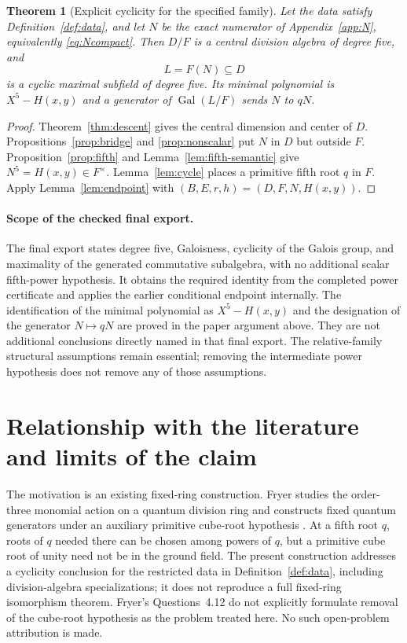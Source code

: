 \documentclass[11pt,letterpaper]{article}
\newtheorem{theorem}{Theorem}[section]
\theoremstyle{definition}
\theoremstyle{remark}
\newcommand{\Gal}{\operatorname{Gal}}
\begin{document}
\begin{theorem}[Explicit cyclicity for the specified family]
\label{thm:main}
Let the data satisfy Definition~\ref{def:data}, and let $N$ be the exact
numerator of Appendix~\ref{app:N}, equivalently \eqref{eq:Ncompact}.
Then $D/F$ is
a central division algebra of degree five, and
\[
L=F(N)\subseteq D
\]
is a cyclic maximal subfield of degree five. Its minimal polynomial is
$X^5-H(x,y)$ and a generator of $\Gal(L/F)$ sends $N$ to $qN$.
\end{theorem}
\begin{proof}
Theorem~\ref{thm:descent} gives the central dimension and center of $D$.
Propositions~\ref{prop:bridge} and \ref{prop:nonscalar} put $N$ in $D$
but outside $F$. Proposition~\ref{prop:fifth} and Lemma~\ref{lem:fifth-semantic} give
$N^5=H(x,y)\in F^\times$. Lemma~\ref{lem:cycle} places a primitive fifth
root $q$ in $F$. Apply Lemma~\ref{lem:endpoint} with
$(B,E,r,h)=(D,F,N,H(x,y))$.
\end{proof}

\paragraph{Scope of the checked final export.}
The final export states degree five, Galoisness, cyclicity of the Galois
group, and maximality of the generated commutative subalgebra, with no
additional scalar fifth-power hypothesis. It obtains the required identity
from the completed power certificate and applies the earlier conditional
endpoint internally. The identification of the minimal polynomial as
$X^5-H(x,y)$ and the designation of the generator $N\mapsto qN$ are proved
in the paper argument above. They are not additional conclusions directly
named in that final export. The relative-family structural assumptions
remain essential; removing the intermediate power hypothesis does not
remove any of those assumptions.

\section{Relationship with the literature and limits of the claim}
\label{sec:literature}

The motivation is an existing fixed-ring construction. Fryer studies the
order-three monomial action on a quantum division ring and constructs
fixed quantum generators under an auxiliary primitive cube-root
hypothesis \cite[Proposition~3.3 and Theorem~3.4]{Fryer}. At a fifth root
$q$, roots of $q$ needed there can be chosen among powers of $q$, but a
primitive cube root of unity need not be in the ground field. The present
construction addresses a cyclicity conclusion for the restricted data in
Definition~\ref{def:data}, including division-algebra specializations;
it does not reproduce a full fixed-ring isomorphism theorem. Fryer's
Questions~4.12 do not explicitly formulate removal of the cube-root
hypothesis as the problem treated here. No such open-problem attribution
is made.
\end{document}
